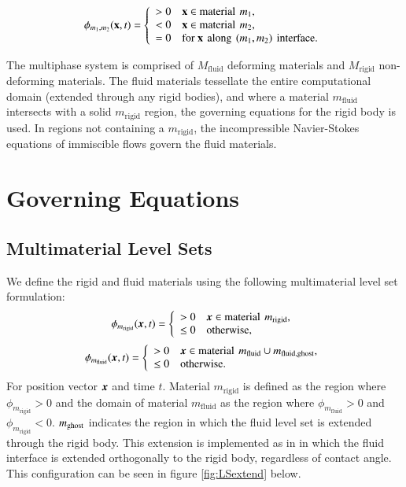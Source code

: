 \documentclass[preprint,12pt]{Definitions/elsarticle}
\newcommand{\mb}{\mathbf}
\newcommand{\tn}{\textnormal}
\newcommand{\bmx}{\mbox{\boldmath $x$\unboldmath}}
\begin{document}
	\begin{equation}
	\phi_{m_1,m_2}(\mb{x},t) = \left\{
	\begin{array}{ll}
	> 0 & \mb{x} \in \tn{material}\,\: m_1, \\ 
	< 0 & \mb{x} \in \tn{material}\,\: m_2, \\ 
	= 0 & \tn{for }\mb{x}\,\: \tn{along}\,\:(m_1,m_2)\,\:\tn{interface}. \\ 
	\end{array}
	\right.
	\end{equation}
	
The multiphase system is comprised of $M_{\textrm{fluid}}$ deforming materials and $M_{\textrm{rigid}}$ non-deforming materials. The fluid materials tessellate the entire computational domain (extended through any rigid bodies), and where a material $m_{\textrm{fluid}}$ intersects with a solid $m_{\textrm{rigid}}$ region, the governing equations for the rigid body is used. In regions not containing a $m_{\textrm{rigid}}$, the incompressible Navier-Stokes equations of immiscible flows govern the fluid materials.

\section{Governing Equations} \label{governingeqs}
\subsection{Multimaterial Level Sets}
\noindent We define the rigid and fluid materials using the following multimaterial level set formulation:
\begin{equation}
\phi_{m_\textrm{rigid}}(\bmx,t) = \left\{
\begin{array}{ll}
> 0 & \bmx \in \tn{material}\,\: m_\textrm{rigid}, \\ 
\leq 0 & \tn{otherwise},
\end{array}
\right.
\end{equation}
\begin{equation}
\phi_{m_\textrm{fluid}}(\bmx,t) = \left\{
\begin{array}{ll}
> 0 & \bmx \in \tn{material}\,\: m_\textrm{fluid}\cup m_\textrm{fluid,ghost}, \\ 
\leq 0 & \tn{otherwise}.
\end{array}
\right.
\end{equation}
For position vector $\bmx$ and time $t$. Material $m_\textrm{rigid}$ is defined as the region where $\phi_{m_\textrm{rigid}}>0$ and the domain of material $m_\textrm{fluid}$ as the region where $\phi_{m_\textrm{fluid}}>0$ and $\phi_{m_\textrm{rigid}}<0$. $m_\tn{ghost}$ indicates the region in which the fluid level set is extended through the rigid body. This extension is implemented as in \cite{ArientiSussman2014embedded} in which the fluid interface is extended orthogonally to the rigid body, regardless of contact angle. This configuration can be seen in figure \ref{fig:LSextend} below.\\
\end{document}
